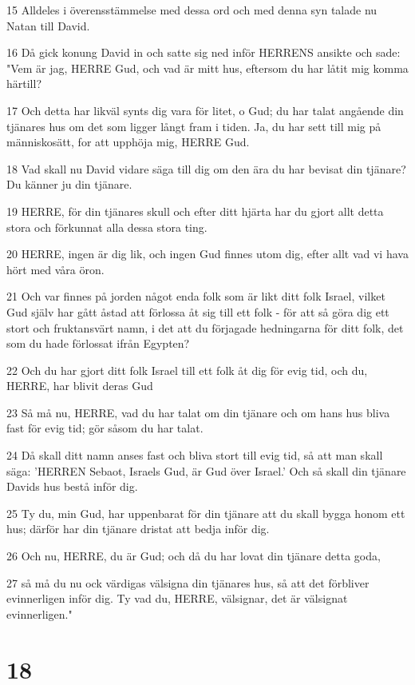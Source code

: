 \par 15 Alldeles i överensstämmelse med dessa ord och med denna syn talade nu Natan till David.
\par 16 Då gick konung David in och satte sig ned inför HERRENS ansikte och sade: "Vem är jag, HERRE Gud, och vad är mitt hus, eftersom du har låtit mig komma härtill?
\par 17 Och detta har likväl synts dig vara för litet, o Gud; du har talat angående din tjänares hus om det som ligger långt fram i tiden. Ja, du har sett till mig på människosätt, for att upphöja mig, HERRE Gud.
\par 18 Vad skall nu David vidare säga till dig om den ära du har bevisat din tjänare? Du känner ju din tjänare.
\par 19 HERRE, för din tjänares skull och efter ditt hjärta har du gjort allt detta stora och förkunnat alla dessa stora ting.
\par 20 HERRE, ingen är dig lik, och ingen Gud finnes utom dig, efter allt vad vi hava hört med våra öron.
\par 21 Och var finnes på jorden något enda folk som är likt ditt folk Israel, vilket Gud själv har gått åstad att förlossa åt sig till ett folk - för att så göra dig ett stort och fruktansvärt namn, i det att du förjagade hedningarna för ditt folk, det som du hade förlossat ifrån Egypten?
\par 22 Och du har gjort ditt folk Israel till ett folk åt dig för evig tid, och du, HERRE, har blivit deras Gud
\par 23 Så må nu, HERRE, vad du har talat om din tjänare och om hans hus bliva fast för evig tid; gör såsom du har talat.
\par 24 Då skall ditt namn anses fast och bliva stort till evig tid, så att man skall säga: 'HERREN Sebaot, Israels Gud, är Gud över Israel.' Och så skall din tjänare Davids hus bestå inför dig.
\par 25 Ty du, min Gud, har uppenbarat för din tjänare att du skall bygga honom ett hus; därför har din tjänare dristat att bedja inför dig.
\par 26 Och nu, HERRE, du är Gud; och då du har lovat din tjänare detta goda,
\par 27 så må du nu ock värdigas välsigna din tjänares hus, så att det förbliver evinnerligen inför dig. Ty vad du, HERRE, välsignar, det är välsignat evinnerligen."

\chapter{18}

